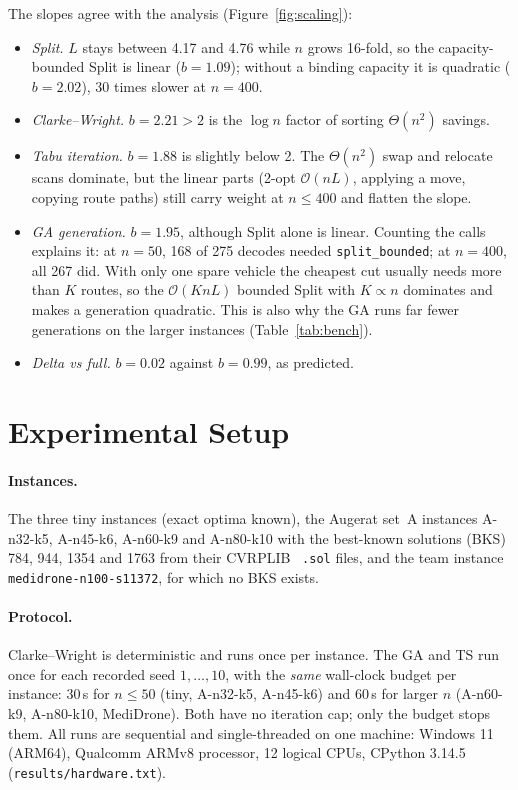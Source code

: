 \documentclass[11pt,a4paper]{article}
\theoremstyle{definition}
\theoremstyle{remark}
\newcommand{\code}[1]{\texttt{#1}}
\newcommand{\Ocal}{\mathcal{O}}
\begin{document}
The slopes agree with the analysis (Figure~\ref{fig:scaling}):
\begin{itemize}
\item \emph{Split.} $L$ stays between 4.17 and 4.76 while $n$ grows 16-fold, so the
  capacity-bounded Split is linear ($b=1.09$); without a binding capacity it is quadratic
  ($b=2.02$), 30 times slower at $n=400$.
\item \emph{Clarke--Wright.} $b=2.21>2$ is the $\log n$ factor of sorting $\Theta(n^2)$
  savings.
\item \emph{Tabu iteration.} $b=1.88$ is slightly below 2. The $\Theta(n^2)$ swap and relocate
  scans dominate, but the linear parts (2-opt $\Ocal(nL)$, applying a move, copying route
  paths) still carry weight at $n\le 400$ and flatten the slope.
\item \emph{GA generation.} $b=1.95$, although Split alone is linear. Counting the calls
  explains it: at $n=50$, 168 of 275 decodes needed \code{split\_bounded}; at $n=400$, all
  267 did. With only one spare vehicle the cheapest cut usually needs more than $K$ routes,
  so the $\Ocal(KnL)$ bounded Split with $K\propto n$ dominates and makes a generation
  quadratic. This is also why the GA runs far fewer generations on the larger instances
  (Table~\ref{tab:bench}).
\item \emph{Delta vs full.} $b=0.02$ against $b=0.99$, as predicted.
\end{itemize}

\section{Experimental Setup}\label{sec:setup}
\paragraph{Instances.} The three tiny instances (exact optima known), the Augerat set~A
instances A-n32-k5, A-n45-k6, A-n60-k9 and A-n80-k10 with the best-known solutions (BKS)
784, 944, 1354 and 1763 from their CVRPLIB~\cite{cvrplib} \code{.sol} files, and the team instance
\code{medidrone-n100-s11372}, for which no BKS exists.

\paragraph{Protocol.} Clarke--Wright is deterministic and runs once per instance. The GA
and TS run once for each recorded seed $1,\dots,10$, with the \emph{same} wall-clock budget
per instance: 30\,s for $n\le 50$ (tiny, A-n32-k5, A-n45-k6) and 60\,s for larger $n$
(A-n60-k9, A-n80-k10, MediDrone). Both have no iteration cap; only the budget stops them.
All runs are sequential and single-threaded on one machine: Windows 11 (ARM64), Qualcomm
ARMv8 processor, 12 logical CPUs, CPython 3.14.5 (\code{results/hardware.txt}).
\end{document}
